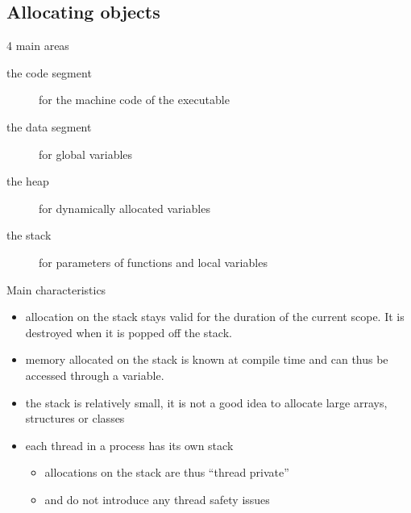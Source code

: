 \subsection[new]{Allocating objects}

\begin{frame}[fragile]
  \begin{block}{4 main areas}
    \begin{description}
    \item[the code segment] for the machine code of the executable
    \item[the data segment] for global variables
    \item[the heap] for dynamically allocated variables
    \item[the stack] for parameters of functions and local variables
    \end{description}
  \end{block}
  \hspace{2.5cm}
\end{frame}

\begin{frame}[fragile]
  \begin{block}{Main characteristics}
    \begin{itemize}
    \item allocation on the stack stays valid for the duration of the current scope.
    It is destroyed when it is popped off the stack.
    \item memory allocated on the stack is known at compile time and can thus be accessed through a variable.
    \item the stack is relatively small, it is not a good idea to allocate large arrays, structures or classes
    \item each thread in a process has its own stack
      \begin{itemize}
      \item allocations on the stack are thus ``thread private''
      \item and do not introduce any thread safety issues
      \end{itemize}
    \end{itemize}
  \end{block}
\end{frame}

